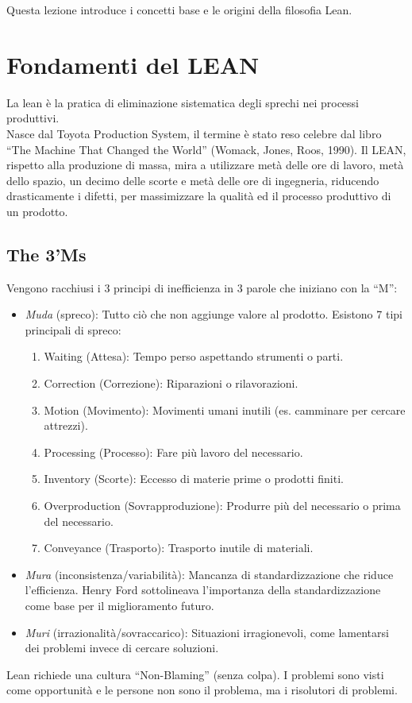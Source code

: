 %
Questa lezione introduce i concetti base e le origini della filosofia Lean.
%
\section{Fondamenti del LEAN}
La \gls{lean} è la pratica di eliminazione sistematica degli sprechi nei processi produttivi. \\
Nasce dal Toyota Production System, il termine è stato reso celebre dal libro ``The Machine That Changed the World'' (Womack, Jones, Roos, 1990).
Il LEAN, rispetto alla produzione di massa, mira a utilizzare metà delle ore di lavoro, metà dello spazio, un decimo delle scorte e metà delle ore di ingegneria, riducendo drasticamente i difetti, per massimizzare la qualità ed il processo produttivo di un prodotto.
%
\subsection{The 3'Ms}
Vengono racchiusi i 3 principi di inefficienza in 3 parole che iniziano con la ``M'':
\begin{itemize}
    \item \emph{Muda} (spreco): Tutto ciò che non aggiunge valore al prodotto. Esistono 7 tipi principali di spreco:
          \begin{enumerate}
              \item Waiting (Attesa): Tempo perso aspettando strumenti o parti.
              \item Correction (Correzione): Riparazioni o rilavorazioni.
              \item Motion (Movimento): Movimenti umani inutili (es. camminare per cercare attrezzi).
              \item Processing (Processo): Fare più lavoro del necessario.
              \item Inventory (Scorte): Eccesso di materie prime o prodotti finiti.
              \item Overproduction (Sovrapproduzione): Produrre più del necessario o prima del necessario.
              \item Conveyance (Trasporto): Trasporto inutile di materiali.
          \end{enumerate}
    \item \emph{Mura} (inconsistenza/variabilità): Mancanza di standardizzazione che riduce l'efficienza. Henry Ford sottolineava l'importanza della standardizzazione come base per il miglioramento futuro.
    \item \emph{Muri} (irrazionalità/sovraccarico): Situazioni irragionevoli, come lamentarsi dei problemi invece di cercare soluzioni.
\end{itemize}
Lean richiede una cultura ``Non-Blaming'' (senza colpa). I problemi sono visti come opportunità e le persone non sono il problema, ma i risolutori di problemi.
%
